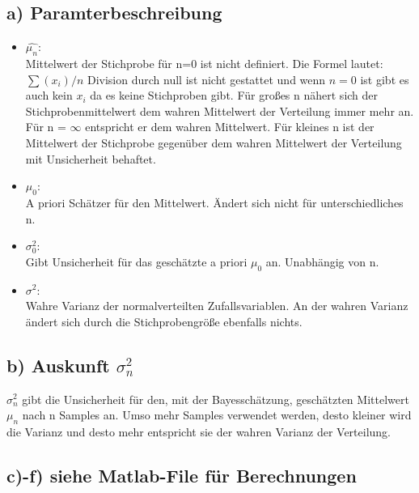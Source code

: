 \documentclass{scrartcl}
\begin{document}
\subsection*{a) Paramterbeschreibung}
\begin{itemize}
	\item $\hat{\mu_n}$:\\
	Mittelwert der Stichprobe für n=0 ist nicht definiert. Die Formel lautet: $\sum(x_i) /n$ Division durch null ist nicht gestattet und wenn $n=0$ ist gibt es auch kein $x_i$ da es keine Stichproben gibt. Für großes n nähert sich der Stichprobenmittelwert dem wahren Mittelwert der Verteilung immer mehr an. Für n = $\infty$ entspricht er dem wahren Mittelwert. Für kleines n ist der Mittelwert der Stichprobe gegenüber dem wahren Mittelwert der Verteilung mit Unsicherheit behaftet.
	\item $\mu_0$:\\
	A priori Schätzer für den Mittelwert. Ändert sich nicht für unterschiedliches n. 
	\item $\sigma^2_0$:\\
	Gibt Unsicherheit für das geschätzte a priori $\mu_0$ an. Unabhängig von n.
	\item $\sigma^2$:\\
	Wahre Varianz der normalverteilten Zufallsvariablen. An der wahren Varianz ändert sich durch die Stichprobengröße ebenfalls nichts.
\end{itemize}

\subsection*{b) Auskunft $\sigma^2_n$}
$\sigma^2_n$ gibt die Unsicherheit für den, mit der Bayesschätzung, geschätzten Mittelwert $\mu_n$ nach n Samples an. Umso mehr Samples verwendet werden, desto kleiner wird die Varianz und desto mehr entspricht sie der wahren Varianz der Verteilung.

\subsection*{c)-f) siehe Matlab-File für Berechnungen}
\end{document}
